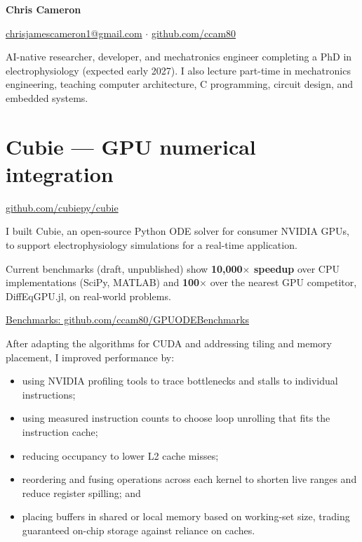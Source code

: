 \documentclass[11pt,a4paper]{article}
\begin{document}
{\fontsize{28}{32}\selectfont\bfseries Chris Cameron\par}
\vspace{2pt}
\href{mailto:chrisjamescameron1@gmail.com}{chrisjamescameron1@gmail.com}
\enspace$\cdot$\enspace
\href{https://github.com/ccam80}{github.com/ccam80}

\vspace{8pt}
AI-native researcher, developer, and mechatronics engineer completing a PhD
in electrophysiology (expected early 2027). I also lecture part-time in
mechatronics engineering, teaching computer architecture, C programming,
circuit design, and embedded systems.

\section{Cubie --- GPU numerical integration}
{\small\color{muted}\href{https://github.com/cubiepy/cubie}{github.com/cubiepy/cubie}\par}
I built Cubie, an open-source Python ODE solver for consumer NVIDIA GPUs, to support
electrophysiology simulations for a real-time application.

Current benchmarks (draft, unpublished) show \textbf{10,000$\times$ speedup}
over CPU implementations (SciPy, MATLAB) and \textbf{100$\times$}
over the nearest GPU competitor, DiffEqGPU.jl, on real-world problems.
{\small\color{muted}\href{https://github.com/ccam80/GPUODEBenchmarks}{Benchmarks: github.com/ccam80/GPUODEBenchmarks}\par}

After adapting the algorithms for CUDA and addressing tiling and memory
placement, I improved performance by:

\begin{itemize}
  \item using NVIDIA profiling tools to trace bottlenecks and stalls
    to individual instructions;
  \item using measured instruction counts to choose loop unrolling
    that fits the instruction cache;
  \item reducing occupancy to lower L2 cache misses;
  \item reordering and fusing operations across each kernel to shorten
    live ranges and reduce register spilling; and
  \item placing buffers in shared or local memory based on working-set size,
    trading guaranteed on-chip storage against reliance on caches.
\end{itemize}
\end{document}
